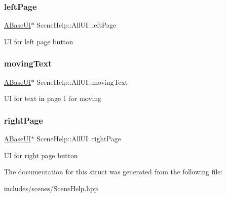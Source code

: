 \subsubsection{\texorpdfstring{left\+Page}{leftPage}}
{\footnotesize\ttfamily \hyperlink{class_a_base_u_i}{A\+Base\+UI}$\ast$ Scene\+Help\+::\+All\+U\+I\+::left\+Page}

UI for left page button \mbox{\label{struct_scene_help_1_1_all_u_i_ad96e5503ebdd34b0adc10a9eb6119ae7}} 
\subsubsection{\texorpdfstring{moving\+Text}{movingText}}
{\footnotesize\ttfamily \hyperlink{class_a_base_u_i}{A\+Base\+UI}$\ast$ Scene\+Help\+::\+All\+U\+I\+::moving\+Text}

UI for text in page 1 for moving \mbox{\label{struct_scene_help_1_1_all_u_i_a0e3069e7a066ec6bed4c4f68f92c7ea0}} 
\subsubsection{\texorpdfstring{right\+Page}{rightPage}}
{\footnotesize\ttfamily \hyperlink{class_a_base_u_i}{A\+Base\+UI}$\ast$ Scene\+Help\+::\+All\+U\+I\+::right\+Page}

UI for right page button 

The documentation for this struct was generated from the following file\+:\begin{DoxyCompactItemize}
\item 
includes/scenes/Scene\+Help.\+hpp\end{DoxyCompactItemize}
